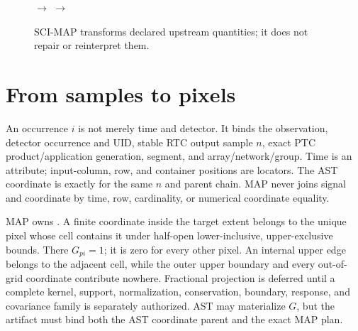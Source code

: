 \documentclass[10pt]{article}
\begin{document}
\begin{figure}[h]
\centering
{}
\hfill\(\longrightarrow\)\hfill
{}
\hfill\(\longrightarrow\)\hfill
{}
\caption{SCI-MAP transforms declared upstream quantities; it does not repair or reinterpret them.}
\label{fig:flow}
\end{figure}

\clearpage
\section{From samples to pixels}\label{sec:samples}
An occurrence \(i\) is not merely time and detector. It binds the observation,
detector occurrence and UID, stable RTC output sample \(n\), exact PTC
product/application generation, segment, and array/network/group. Time is an
attribute; input-column, row, and container positions are locators. The AST
coordinate is exactly \SCIMapASTRTCGridProfile{} for the
same \(n\) and parent chain. MAP never joins signal and coordinate by time,
row, cardinality, or numerical coordinate equality.

MAP owns \SCIMapOneHotProfile. A finite coordinate inside
the target extent belongs to the unique pixel whose cell contains it under
half-open lower-inclusive, upper-exclusive bounds. There \(G_{pi}=1\); it is
zero for every other pixel. An internal upper edge belongs to the adjacent
cell, while the outer upper boundary and every out-of-grid coordinate
contribute nowhere. Fractional projection is deferred until a complete
kernel, support, normalization, conservation, boundary, response, and
covariance family is separately authorized. AST may materialize \(G\), but the
artifact must bind both the AST coordinate parent and the exact MAP plan.
\end{document}
